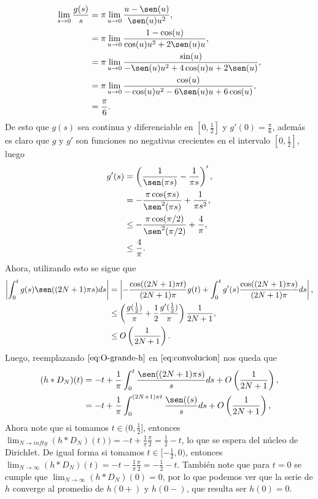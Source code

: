 \begin{align*}
  \lim_{s \to 0}\frac{g(s)}{s}&=\pi\lim_{u \to 0}\frac{u-\sen(u)}{\sen(u)u^2},\\
  &=\pi \lim_{u \to 0}\frac{1-\cos(u)}{\cos(u)u^2+2\sen(u)u},\\
  &=\pi \lim_{u \to 0}\frac{\sin(u)}{-\sen(u)u^2+4\cos(u)u+2\sen(u)},\\
  &=\pi \lim_{u \to 0}\frac{\cos(u)}{-\cos(u)u^2-6\sen(u)u+6\cos(u)},\\
  &=\frac{\pi}{6}.
\end{align*}
De esto que $g(s)$ sea continua y diferenciable en $[0,\frac{1}{2}]$ y $g'(0)=\frac{\pi}{6}$, además es claro que $g$ y $g'$ son funciones no negativas crecientes en el intervalo $[0,\frac{1}{2}]$, luego
\begin{align*}
  g'(s)&=\left( \frac{1}{\sen(\pi s)}-\frac{1}{\pi s} \right)',\\
  &=-\frac{\pi\cos(\pi s)}{\sen^2(\pi s)}+\frac{1}{\pi s^2},\\
  &\leq -\frac{\pi\cos(\pi/2)}{\sen^2(\pi/2)}+\frac{4}{\pi},\\
  &\leq \frac{4}{\pi}.
\end{align*}
Ahora, utilizando esto se sigue que
\begin{equation}\label{eq:O-grande-h}
  \begin{split}
    \left|\int_{0}^{t}g(s)\sen((2N+1)\pi s)ds\right|&=\left|-\frac{\cos((2N+1)\pi t)}{(2N+1)\pi}g(t)+\int_{0}^{t}g'(s)\frac{\cos((2N+1)\pi s)}{(2N+1)\pi}ds\right|,\\
    &\leq \left( \frac{g(\frac{1}{2})}{\pi}+\frac{1}{2}\frac{g'(\frac{1}{2})}{\pi} \right)\frac{1}{2N+1},\\
    &\leq O\left( \frac{1}{2N+1} \right).
  \end{split}
\end{equation}
Luego, reemplazando $\ref{eq:O-grande-h}$ en $\ref{eq:convolucion}$ nos queda que
\begin{equation}\label{eq:6}
  \begin{split}
    (h*D_{N})(t)&=-t+\frac{1}{\pi}\int_{0}^{t}  \frac{\sen((2N+1)\pi s)}{s}ds+O\left( \frac{1}{2N+1} \right),\\
    &=-t+\frac{1}{\pi}\int_{0}^{(2N+1)\pi t}  \frac{\sen((s)}{s}ds+O\left( \frac{1}{2N+1} \right),\\
  \end{split}
\end{equation}
Ahora note que si tomamos $t\in(0,\frac{1}{2}]$, entonces $\lim_{N \to infty}(h*D_N)(t))=-t+\frac{1}{\pi}\frac{\pi}{2}=\frac{1}{2}-t$, lo que se espera del núcleo de Dirichlet. De igual forma si tomamos $t\in[-\frac{1}{2},0)$, entonces $\lim_{N \to \infty}(h*D_N)(t)=-t-\frac{1}{\pi}\frac{\pi}{2}=-\frac{1}{2}-t$. También note que para $t=0$ se cumple que $\lim_{N \to \infty}(h*D_{N})(0)=0$, por lo que podemos ver que la serie de $h$ converge al promedio de $h(0+)$ y $h(0-)$, que resulta ser $h(0)=0$.\\
